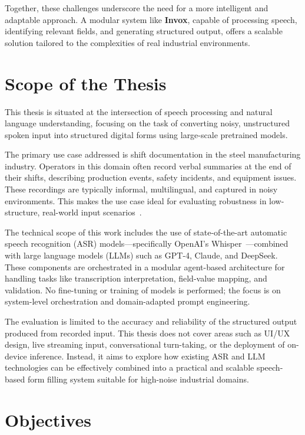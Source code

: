 Together, these challenges underscore the need for a more intelligent and adaptable approach. A modular system like \textbf{Invox}, capable of processing speech, identifying relevant fields, and generating structured output, offers a scalable solution tailored to the complexities of real industrial environments.


\section{Scope of the Thesis}

This thesis is situated at the intersection of speech processing and natural language understanding, focusing on the task of converting noisy, unstructured spoken input into structured digital forms using large-scale pretrained models.

The primary use case addressed is shift documentation in the steel manufacturing industry. Operators in this domain often record verbal summaries at the end of their shifts, describing production events, safety incidents, and equipment issues. These recordings are typically informal, multilingual, and captured in noisy environments. This makes the use case ideal for evaluating robustness in low-structure, real-world input scenarios~\cite{wang2021spoken, fathullah2023prompting}.

The technical scope of this work includes the use of state-of-the-art automatic speech recognition (ASR) models—specifically OpenAI's Whisper~\cite{radford2023whisper}—combined with large language models (LLMs) such as GPT-4, Claude, and DeepSeek. These components are orchestrated in a modular agent-based architecture for handling tasks like transcription interpretation, field-value mapping, and validation. No fine-tuning or training of models is performed; the focus is on system-level orchestration and domain-adapted prompt engineering.

The evaluation is limited to the accuracy and reliability of the structured output produced from recorded input. This thesis does not cover areas such as UI/UX design, live streaming input, conversational turn-taking, or the deployment of on-device inference. Instead, it aims to explore how existing ASR and LLM technologies can be effectively combined into a practical and scalable speech-based form filling system suitable for high-noise industrial domains.


\section{Objectives}

